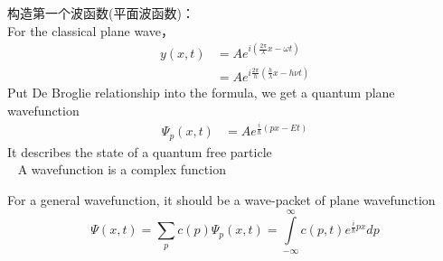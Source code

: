 \begin{frame}
    \frametitle{}
    构造第一个波函数(平面波函数)：~\\
    For the classical plane wave，
        \begin{equation*}
            \begin{split}
                y(x,t)&=A e^{i(\frac{2\pi}{\lambda}x-\omega t)} \\
                    & = A e^{i\frac{2\pi}{h}(\frac{h}{\lambda}x-h\nu t)}
            \end{split} 
        \end{equation*}
        Put De Broglie relationship into the formula, we get a quantum plane wavefunction
        \begin{equation*}
            \begin{split}
                \Psi_p(x,t)&=A e^{\frac{i}{\hbar}(px-Et)}
            \end{split} 
         \end{equation*}
         It describes the state of a quantum free particle\\
         \Note ~ A wavefunction is a complex function 
\end{frame}

\begin{frame}
         For a general wavefunction, it should be a wave-packet of plane wavefunction
         \begin{equation*}
                \Psi(x,t)=\sum\limits_{p} c(p)\Psi_p(x,t) = \int\limits_{-\infty} ^{\infty} c(p,t) e^{\frac{i}{\hbar}px}dp
         \end{equation*}
\end{frame}



